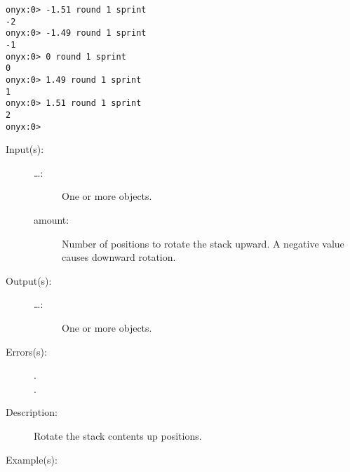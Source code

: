 \begin{description}
\begin{description}
\begin{verbatim}
onyx:0> -1.51 round 1 sprint
-2
onyx:0> -1.49 round 1 sprint
-1
onyx:0> 0 round 1 sprint
0
onyx:0> 1.49 round 1 sprint
1
onyx:0> 1.51 round 1 sprint
2
onyx:0>
		\end{verbatim}
	\end{description}
\label{systemdict:rot}
\item[{\onyxop{\dots amount}{rot}{\dots}}: ]
	\begin{description}\item[]
	\item[Input(s): ]
		\begin{description}\item[]
		\item[\dots: ]
			One or more objects.
		\item[amount: ]
			Number of positions to rotate the stack upward.  A
			negative value causes downward rotation.
		\end{description}
	\item[Output(s): ]
		\begin{description}\item[]
		\item[\dots: ]
			One or more objects.
		\end{description}
	\item[Errors(s): ]
		\begin{description}\item[]
		\item[.]
		\item[.]
		\end{description}
	\item[Description: ]
		Rotate the stack contents up  positions.
	\item[Example(s): ]\begin{verbatim}


\end{verbatim}
\end{description}
\end{description}
